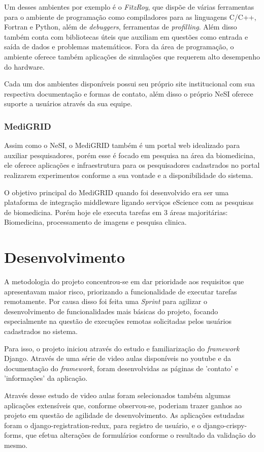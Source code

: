 \documentclass[tg]{mdtufsm}
\begin{document}
Um desses ambientes por exemplo é o \emph{FitzRoy}, que dispõe de várias ferramentas para o ambiente de programação como compiladores para as linguagens C/C++, Fortran e Python, além de \textit{debuggers}, ferramentas de \textit{profilling}. Além disso também conta com bibliotecas úteis que auxiliam em questões como entrada e saída de dados e problemas matemáticos. Fora da área de programação, o ambiente oferece também aplicações de simulações que requerem alto desempenho do hardware.

Cada um dos ambientes disponíveis possui seu próprio site institucional com sua respectiva documentação e formas de contato, além disso o próprio NeSI oferece suporte a usuários através da sua equipe.

\subsection{MediGRID}
Assim como o NeSI, o MediGRID \cite{medigrid} também é um portal web idealizado para auxiliar pesquisadores, porém esse é focado em pesquisa na área da biomedicina, ele oferece aplicações e infraestrutura para os pesquisadores cadastrados no portal realizarem experimentos conforme a sua vontade e a disponibilidade do sistema. 

O objetivo principal do MediGRID quando foi desenvolvido era ser uma plataforma de integração middleware ligando serviços eScience com as pesquisas de biomedicina. Porém hoje ele executa tarefas em 3 áreas majoritárias: Biomedicina, processamento de imagens e pesquisa clinica.
\fi


\chapter{Desenvolvimento}
A metodologia do projeto concentrou-se em dar prioridade aos requisitos que apresentavam maior risco, priorizando a funcionalidade de executar tarefas remotamente. Por causa disso foi feita uma \emph{Sprint} para agilizar o desenvolvimento de funcionalidades mais básicas do projeto, focando especialmente na questão de execuções remotas solicitadas pelos usuários cadastrados no sistema.

Para isso, o projeto iniciou através do estudo e familiarização do \emph{framework} Django. Através de uma série de video aulas disponíveis no youtube e da documentação do \emph{framework}, foram desenvolvidas as páginas de 'contato' e 'informações' da aplicação.

Através desse estudo de video aulas foram selecionados também algumas aplicações extensíveis que, conforme observou-se, poderiam trazer ganhos ao projeto em questão de agilidade de desenvolvimento. As aplicações estudadas foram o django-registration-redux, para registro de usuário, e o django-crispy-forms, que efetua alterações de formulários conforme o resultado da validação do mesmo.
\end{document}
